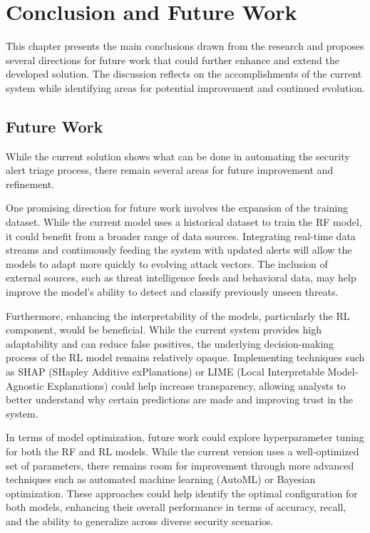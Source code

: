 \chapter{Conclusion and Future Work}
\label{chap:Chapter5}

This chapter presents the main conclusions drawn from the research and proposes several directions for future work that could further enhance and extend the developed solution. 
The discussion reflects on the accomplishments of the current system while identifying areas for potential improvement and continued evolution.

\section{Future Work}

While the current solution shows what can be done in automating the security alert triage process, there remain several areas for future improvement and refinement. 

One promising direction for future work involves the expansion of the training dataset. 
While the current model uses a historical dataset to train the RF model, it could benefit from a broader range of data sources. 
Integrating real-time data streams and continuously feeding the system with updated alerts will allow the models to adapt more quickly to evolving attack vectors. 
The inclusion of external sources, such as threat intelligence feeds and behavioral data, may help improve the model's ability to detect and classify previously unseen threats.

Furthermore, enhancing the interpretability of the models, particularly the RL component, would be beneficial. 
While the current system provides high adaptability and can reduce false positives, the underlying decision-making process of the RL model remains relatively opaque. 
Implementing techniques such as SHAP (SHapley Additive exPlanations) or LIME (Local Interpretable Model-Agnostic Explanations) could help increase transparency, allowing analysts to better understand why certain predictions are made and improving trust in the system.

In terms of model optimization, future work could explore hyperparameter tuning for both the RF and RL models. 
While the current version uses a well-optimized set of parameters, there remains room for improvement through more advanced techniques such as automated machine learning (AutoML) or Bayesian optimization. 
These approaches could help identify the optimal configuration for both models, enhancing their overall performance in terms of accuracy, recall, and the ability to generalize across diverse security scenarios.

